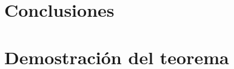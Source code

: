 \documentclass[a4paper,12pt]{report}
\begin{document}


\chapter{Conclusiones}

\appendix

\chapter{Demostración del teorema}



\end{document}
